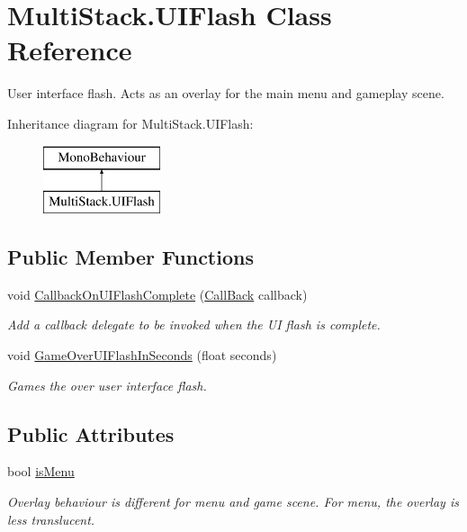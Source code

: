 \hypertarget{class_multi_stack_1_1_u_i_flash}{}\section{Multi\+Stack.\+U\+I\+Flash Class Reference}
\label{class_multi_stack_1_1_u_i_flash}


User interface flash. Acts as an overlay for the main menu and gameplay scene.  


Inheritance diagram for Multi\+Stack.\+U\+I\+Flash\+:\begin{figure}[H]
\begin{center}
\leavevmode
\includegraphics[height=2.000000cm]{class_multi_stack_1_1_u_i_flash}
\end{center}
\end{figure}
\subsection*{Public Member Functions}
\begin{DoxyCompactItemize}
\item 
void \hyperlink{class_multi_stack_1_1_u_i_flash_ae2b952342c47eeac57747601a724368c}{Callback\+On\+U\+I\+Flash\+Complete} (\hyperlink{namespace_multi_stack_a4bd4097b52deebcafccf5815a8495960}{Call\+Back} callback)
\begin{DoxyCompactList}\small\item\em Add a callback delegate to be invoked when the U\+I flash is complete. \end{DoxyCompactList}\item 
void \hyperlink{class_multi_stack_1_1_u_i_flash_a9c6d28d75576441b49a23682378c8411}{Game\+Over\+U\+I\+Flash\+In\+Seconds} (float seconds)
\begin{DoxyCompactList}\small\item\em Games the over user interface flash. \end{DoxyCompactList}\end{DoxyCompactItemize}
\subsection*{Public Attributes}
\begin{DoxyCompactItemize}
\item 
bool \hyperlink{class_multi_stack_1_1_u_i_flash_a520d1f1f11407f2c7feb9d790c659854}{is\+Menu}
\begin{DoxyCompactList}\small\item\em Overlay behaviour is different for menu and game scene. For menu, the overlay is less translucent. \end{DoxyCompactList}\end{DoxyCompactItemize}


